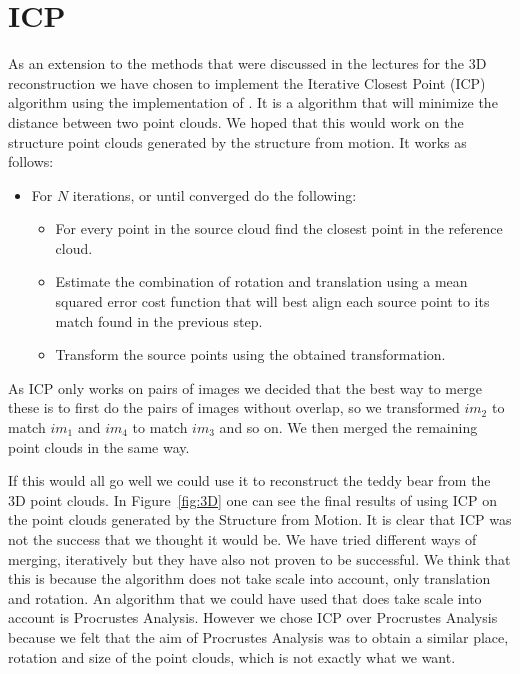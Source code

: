 \section{ICP}
\label{ICP}
As an extension to the methods that were discussed in the lectures for the 3D reconstruction we have chosen to implement the Iterative Closest Point (ICP) algorithm using the implementation of \cite{ICP}. It is a algorithm that will minimize the distance between two point clouds. We hoped that this would work on the structure point clouds generated by the structure from motion. It works as follows:

\begin{itemize}
	\item For $N$ iterations, or until converged do the following:
	\begin{itemize}
		\item For every point in the source cloud find the closest point in the reference cloud.
		\item Estimate the combination of rotation and translation using a mean squared error cost function that will best align each source point to its match found in the previous step.
		\item Transform the source points using the obtained transformation.
	\end{itemize}
\end{itemize}

As ICP only works on pairs of images we decided that the best way to merge these is to first do the pairs of images without overlap, so we transformed $im_2$ to match $im_1$ and $im_4$ to match $im_3$ and so on. We then merged the remaining point clouds in the same way.

If this would all go well we could use it to reconstruct the teddy bear from the 3D point clouds. In Figure~\ref{fig:3D} one can see the final results of using ICP on the point clouds generated by the Structure from Motion. It is clear that ICP was not the success that we thought it would be. We have tried different ways of merging, iteratively but they have also not proven to be successful. We think that this is because the algorithm does not take scale into account, only translation and rotation. An algorithm that we could have used that does take scale into account is Procrustes Analysis\cite{procrustes}. However we chose ICP over Procrustes Analysis because we felt that the aim of Procrustes Analysis was to obtain a similar place, rotation and size of the point clouds, which is not exactly what we want.

